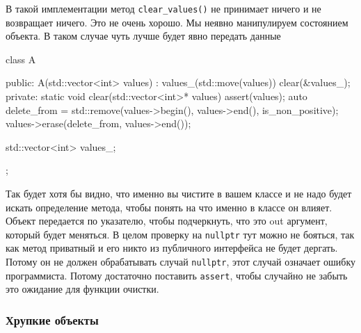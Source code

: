 В такой имплементации метод \verb"clear_values()" не принимает ничего и не возвращает ничего.
Это не очень хорошо.
Мы неявно манипулируем состоянием объекта.
В таком случае чуть лучше будет явно передать данные
\begin{cppcode}
class A {
public:
  A(std::vector<int> values)
   : values_(std::move(values)) {
    clear(&values_);
  }
private:
  static void clear(std::vector<int>* values) {
    assert(values);
    auto delete_from =
        std::remove(values->begin(), values->end(), is_non_positive);
    values->erase(delete_from, values->end());
  }

  std::vector<int> values_;
};
\end{cppcode}
Так будет хотя бы видно, что именно вы чистите в вашем классе и не надо будет искать определение метода, чтобы понять на что именно в классе он влияет.
Объект передается по указателю, чтобы подчеркнуть, что это out аргумент, который будет меняться.
В целом проверку на \verb"nullptr" тут можно не бояться, так как метод приватный и его никто из публичного интерфейса не будет дергать.
Потому он не должен обрабатывать случай \verb"nullptr", этот случай означает ошибку программиста.
Потому достаточно поставить \verb"assert", чтобы случайно не забыть это ожидание для функции очистки.

\subsubsection{Хрупкие объекты}
\label{section::fragile}


